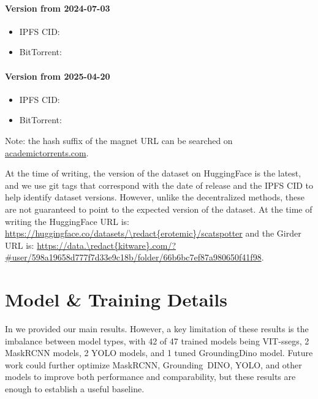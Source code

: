 \paragraph{Version from 2024-07-03}
\begin{itemize}
  \item IPFS CID: 
  \item BitTorrent: 
\end{itemize}

\paragraph{Version from 2025-04-20}
\begin{itemize}
  \item IPFS CID: 
  \item BitTorrent: 
\end{itemize}
Note: the hash suffix of the magnet URL can be searched on \url{academictorrents.com}.

At the time of writing, the version of the dataset on HuggingFace is the latest, and we use git tags that
  correspond with the date of release and the IPFS CID to help identify dataset versions.
However, unlike the decentralized methods, these are not guaranteed to point to the expected version of the
  dataset.
At the time of writing the HuggingFace URL is:
\url{https://huggingface.co/datasets/\redact{erotemic}/scatspotter} and the Girder URL is:
\url{https://data.\redact{kitware}.com/?#user/598a19658d777f7d33e9c18b/folder/66b6bc7ef87a980650f41f98}.


\section{Model \& Training Details}
\label{sec:experiment_details}

In  we provided our main results.
However, a key limitation of these results is the imbalance between model types, with 42 of 47 trained
  models being VIT-ssegs, 2 MaskRCNN models, 2 YOLO models, and 1 tuned GroundingDino model.
Future work could further optimize MaskRCNN, Grounding~DINO, YOLO, and other models to improve both
  performance and comparability, but these results are enough to establish a useful baseline.

